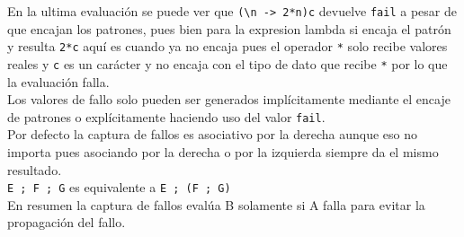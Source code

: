       \begin{fxcode}
         \\
         \\
         \\
         \\
         \\
         \\
         \\
         \\
         \\
         \\
         \outcode{()}
      \end{fxcode}
      
      En la ultima evaluación se puede ver que \texttt{(\textbackslash n ->~2*n)\textquotesingle c\textquotesingle} devuelve \texttt{fail} a pesar de que encajan los patrones, pues bien para la expresion lambda si encaja el patrón y resulta \texttt{2*\textquotesingle c\textquotesingle} aquí es cuando ya no encaja pues el operador \texttt{*} solo recibe valores reales y \texttt{\textquotesingle c\textquotesingle} es un carácter y no encaja con el tipo de dato que recibe \texttt{*} por lo que la evaluación falla.
      \\
      
      Los valores de fallo solo pueden ser generados implícitamente mediante el encaje de patrones o explícitamente haciendo uso del valor \texttt{fail}.
      \\
      
      Por defecto la captura de fallos es asociativo por la derecha aunque eso no importa pues asociando por la derecha o por la izquierda siempre da el mismo resultado.
      \\
      
      \texttt{E ; F ; G} es equivalente a \texttt{E ; (F ; G)}
      \\
      
      En resumen la captura de fallos evalúa B solamente si A falla para evitar la propagación del fallo.
      
